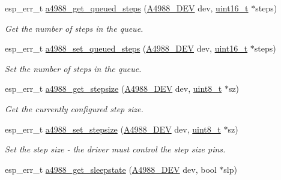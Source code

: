 \begin{DoxyCompactItemize}
esp\+\_\+err\+\_\+t \hyperlink{group__A4988__Driver__functions_ga144d15a11c15f6404e03850da79f51b9}{a4988\+\_\+get\+\_\+queued\+\_\+steps} (\hyperlink{group__A4988__definitions_ga16590a9dd79ad8fcf4c317be2659b6c5}{A4988\+\_\+\+D\+EV} dev, \hyperlink{vl53l0x__types_8h_a273cf69d639a59973b6019625df33e30}{uint16\+\_\+t} $\ast$steps)
\begin{DoxyCompactList}\small\item\em Get the number of steps in the queue. \end{DoxyCompactList}\item 
esp\+\_\+err\+\_\+t \hyperlink{group__A4988__Driver__functions_ga54510570aa6ac5475af005f81d93c5b0}{a4988\+\_\+set\+\_\+queued\+\_\+steps} (\hyperlink{group__A4988__definitions_ga16590a9dd79ad8fcf4c317be2659b6c5}{A4988\+\_\+\+D\+EV} dev, \hyperlink{vl53l0x__types_8h_a273cf69d639a59973b6019625df33e30}{uint16\+\_\+t} $\ast$steps)
\begin{DoxyCompactList}\small\item\em Set the number of steps in the queue. \end{DoxyCompactList}\item 
esp\+\_\+err\+\_\+t \hyperlink{group__A4988__Driver__functions_gab5150822a8c40c8bbf66fc67c4ad43a7}{a4988\+\_\+get\+\_\+stepsize} (\hyperlink{group__A4988__definitions_ga16590a9dd79ad8fcf4c317be2659b6c5}{A4988\+\_\+\+D\+EV} dev, \hyperlink{vl53l0x__types_8h_aba7bc1797add20fe3efdf37ced1182c5}{uint8\+\_\+t} $\ast$sz)
\begin{DoxyCompactList}\small\item\em Get the currently configured step size. \end{DoxyCompactList}\item 
esp\+\_\+err\+\_\+t \hyperlink{group__A4988__Driver__functions_gaf2408ca27eb89e542e82a3c7874aa6b3}{a4988\+\_\+set\+\_\+stepsize} (\hyperlink{group__A4988__definitions_ga16590a9dd79ad8fcf4c317be2659b6c5}{A4988\+\_\+\+D\+EV} dev, \hyperlink{vl53l0x__types_8h_aba7bc1797add20fe3efdf37ced1182c5}{uint8\+\_\+t} $\ast$sz)
\begin{DoxyCompactList}\small\item\em Set the step size -\/ the driver must control the step size pins. \end{DoxyCompactList}\item 
esp\+\_\+err\+\_\+t \hyperlink{group__A4988__Driver__functions_ga19ad6378ca6f643f535025921d8246f0}{a4988\+\_\+get\+\_\+sleepstate} (\hyperlink{group__A4988__definitions_ga16590a9dd79ad8fcf4c317be2659b6c5}{A4988\+\_\+\+D\+EV} dev, bool $\ast$slp)

\end{DoxyCompactItemize}
